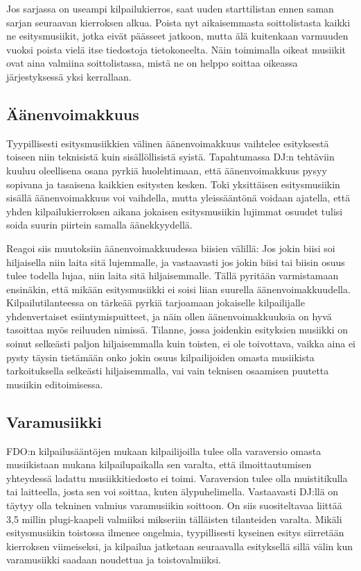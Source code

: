 \documentclass[12pt, a4paper, oneside]{article}
\begin{document}
Jos sarjassa on useampi kilpailukierros,
saat uuden starttilistan ennen saman sarjan seuraavan kierroksen alkua.
Poista nyt aikaisemmasta soittolistasta kaikki ne esitysmusiikit,
jotka eivät päässeet jatkoon,
mutta älä kuitenkaan varmuuden vuoksi poista vielä itse tiedostoja tietokoneelta.
Näin toimimalla oikeat musiikit ovat aina valmiina soittolistassa,
mistä ne on helppo soittaa oikeassa järjestyksessä yksi kerrallaan.

\subsection{Äänenvoimakkuus} \label{subsec:aanenvoimakkuus}

Tyypillisesti esitysmusiikkien välinen äänenvoimakkuus vaihtelee esityksestä toiseen niin teknisistä kuin sisällöllisistä syistä.
Tapahtumassa DJ:n tehtäviin kuuluu oleellisena osana pyrkiä huolehtimaan,
että äänenvoimakkuus pysyy sopivana ja tasaisena kaikkien esitysten kesken.
Toki yksittäisen esitysmusiikin sisällä äänenvoimakkuus voi vaihdella,
mutta yleissääntönä voidaan ajatella,
että yhden kilpailukierroksen aikana jokaisen esitysmusiikin lujimmat osuudet tulisi soida suurin piirtein samalla äänekkyydellä.

Reagoi siis muutoksiin äänenvoimakkuudessa biisien välillä:
Jos jokin biisi soi hiljaisella niin laita sitä lujemmalle,
ja vastaavasti jos jokin biisi tai biisin osuus tulee todella lujaa,
niin laita sitä hiljaisemmalle.
Tällä pyritään varmistamaan ensinäkin,
että mikään esitysmusiikki ei soisi liian suurella äänenvoimakkuudella.
Kilpailutilanteessa on tärkeää pyrkiä tarjoamaan jokaiselle kilpailijalle yhdenvertaiset esiintymispuitteet,
ja näin ollen äänenvoimakkuuksia on hyvä tasoittaa myös reiluuden nimissä.
Tilanne,
jossa joidenkin esityksien musiikki on soinut selkeästi paljon hiljaisemmalla kuin toisten,
ei ole toivottava,
vaikka aina ei pysty täysin tietämään onko jokin osuus kilpailijoiden omasta musiikista tarkoituksella selkeästi hiljaisemmalla,
vai vain teknisen osaamisen puutetta musiikin editoimisessa.

\subsection{Varamusiikki} \label{subsec:varamusiikki}

FDO:n kilpailusääntöjen mukaan kilpailijoilla tulee olla varaversio omasta musiikistaan mukana kilpailupaikalla sen varalta,
että ilmoittautumisen yhteydessä ladattu musiikkitiedosto ei toimi.
Varaversion tulee olla muistitikulla tai laitteella,
josta sen voi soittaa,
kuten älypuhelimella.
Vastaavasti DJ:llä on täytyy olla tekninen valmius varamusiikin soittoon.
On siis suositeltavaa liittää 3,5 millin plugi-kaapeli valmiiksi mikseriin tälläisten tilanteiden varalta.
Mikäli esitysmusiikin toistossa ilmenee ongelmia,
tyypillisesti kyseinen esitys siirretään kierroksen viimeiseksi,
ja kilpailua jatketaan seuraavalla esityksellä sillä välin kun varamusiikki saadaan noudettua ja toistovalmiiksi.
\end{document}
